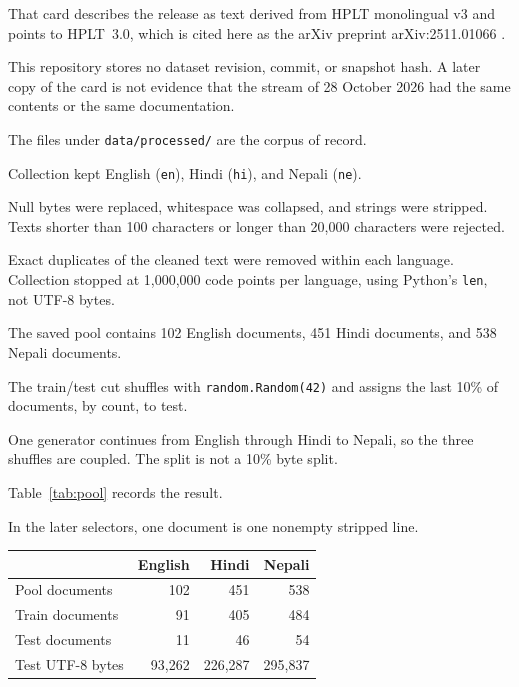 \documentclass[10pt,twocolumn]{article}
\begin{document}
That card describes the release as text derived from
HPLT monolingual v3 and points to HPLT~3.0, which is
cited here as the arXiv preprint arXiv:2511.01066
\citep{oepen-etal-2025-hplt}.

This repository stores no dataset revision, commit,
or snapshot hash. A later copy of the card is not
evidence that the stream of 28 October 2026 had the
same contents or the same documentation.

The files under \texttt{data/processed/} are the
corpus of record.

Collection kept English (\texttt{en}), Hindi (\texttt{hi}),
and Nepali (\texttt{ne}).

Null bytes were replaced, whitespace was collapsed,
and strings were stripped. Texts shorter than 100
characters or longer than 20,000 characters were rejected.

Exact duplicates of the cleaned text were removed within
each language. Collection stopped at 1,000,000 code
points per language, using Python's \texttt{len},
not UTF-8 bytes.

The saved pool contains 102 English documents,
451 Hindi documents, and 538 Nepali documents.

The train/test cut shuffles with \texttt{random.Random(42)}
and assigns the last 10\% of documents, by count, to test.

One generator continues from English through Hindi to
Nepali, so the three shuffles are coupled. The split is
not a 10\% byte split.

Table~\ref{tab:pool} records the result.

In the later selectors, one document is one nonempty
stripped line.

\begin{center}
\small
\begin{tabular}{@{}lrrr@{}}
\toprule
 & English & Hindi & Nepali \\
\midrule
Pool documents & 102 & 451 & 538 \\
Train documents & 91 & 405 & 484 \\
Test documents & 11 & 46 & 54 \\
Test UTF-8 bytes & 93,262 & 226,287 & 295,837 \\
\bottomrule
\end{tabular}

\label{tab:pool}
\end{center}
\end{document}

